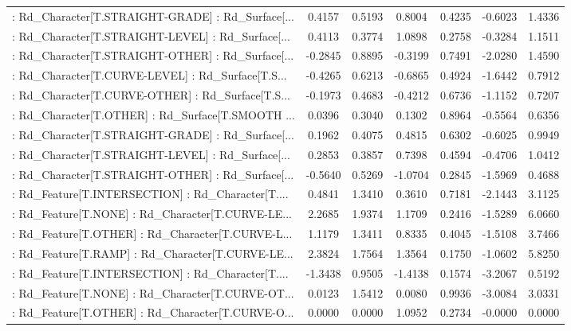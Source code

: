 \begin{longtable}{p{4cm}cccccc}
 : Rd\_Character[T.STRAIGHT-GRADE] : Rd\_Surface[... &  0.4157 &    0.5193 &  0.8004 &       0.4235 & -0.6023 &  1.4336 \\
 : Rd\_Character[T.STRAIGHT-LEVEL] : Rd\_Surface[... &  0.4113 &    0.3774 &  1.0898 &       0.2758 & -0.3284 &  1.1511 \\
 : Rd\_Character[T.STRAIGHT-OTHER] : Rd\_Surface[... & -0.2845 &    0.8895 & -0.3199 &       0.7491 & -2.0280 &  1.4590 \\
 : Rd\_Character[T.CURVE-LEVEL] : Rd\_Surface[T.S... & -0.4265 &    0.6213 & -0.6865 &       0.4924 & -1.6442 &  0.7912 \\
 : Rd\_Character[T.CURVE-OTHER] : Rd\_Surface[T.S... & -0.1973 &    0.4683 & -0.4212 &       0.6736 & -1.1152 &  0.7207 \\
 : Rd\_Character[T.OTHER] : Rd\_Surface[T.SMOOTH ... &  0.0396 &    0.3040 &  0.1302 &       0.8964 & -0.5564 &  0.6356 \\
 : Rd\_Character[T.STRAIGHT-GRADE] : Rd\_Surface[... &  0.1962 &    0.4075 &  0.4815 &       0.6302 & -0.6025 &  0.9949 \\
 : Rd\_Character[T.STRAIGHT-LEVEL] : Rd\_Surface[... &  0.2853 &    0.3857 &  0.7398 &       0.4594 & -0.4706 &  1.0412 \\
 : Rd\_Character[T.STRAIGHT-OTHER] : Rd\_Surface[... & -0.5640 &    0.5269 & -1.0704 &       0.2845 & -1.5969 &  0.4688 \\
 : Rd\_Feature[T.INTERSECTION] : Rd\_Character[T.... &  0.4841 &    1.3410 &  0.3610 &       0.7181 & -2.1443 &  3.1125 \\
 : Rd\_Feature[T.NONE] : Rd\_Character[T.CURVE-LE... &  2.2685 &    1.9374 &  1.1709 &       0.2416 & -1.5289 &  6.0660 \\
 : Rd\_Feature[T.OTHER] : Rd\_Character[T.CURVE-L... &  1.1179 &    1.3411 &  0.8335 &       0.4045 & -1.5108 &  3.7466 \\
 : Rd\_Feature[T.RAMP] : Rd\_Character[T.CURVE-LE... &  2.3824 &    1.7564 &  1.3564 &       0.1750 & -1.0602 &  5.8250 \\
 : Rd\_Feature[T.INTERSECTION] : Rd\_Character[T.... & -1.3438 &    0.9505 & -1.4138 &       0.1574 & -3.2067 &  0.5192 \\
 : Rd\_Feature[T.NONE] : Rd\_Character[T.CURVE-OT... &  0.0123 &    1.5412 &  0.0080 &       0.9936 & -3.0084 &  3.0331 \\
 : Rd\_Feature[T.OTHER] : Rd\_Character[T.CURVE-O... &  0.0000 &    0.0000 &  1.0952 &       0.2734 & -0.0000 &  0.0000 \\

\end{longtable}
